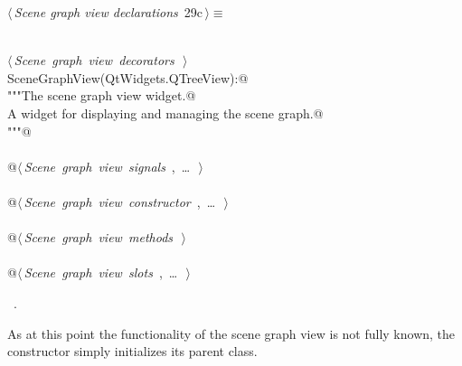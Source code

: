 \documentclass[
    a4paper,      %
    10pt,         %
    openright,    %
    notitlepage,  %
    parskip=half, %
]{scrreprt}       %
\theoremstyle{definition}                    %
\begin{document}
\begin{flushleft} \small
\begin{minipage}{\linewidth}\label{scrap31}\raggedright\small
{} $\langle\,${\itshape Scene graph view declarations}\nobreak\ {\footnotesize {29c}}$\,\rangle\equiv$
\vspace{-1exm}
\begin{list}{}{} \item
\mbox{}\lstinline@@\\
\mbox{}\lstinline@@\hbox{$\langle\,${\itshape Scene graph view decorators}\nobreak\ {\footnotesize {}}$\,\rangle$}\lstinline@@\\
\mbox{}\lstinline@class SceneGraphView(QtWidgets.QTreeView):@\\
\mbox{}\lstinline@    """The scene graph view widget.@\\
\mbox{}\lstinline@    A widget for displaying and managing the scene graph.@\\
\mbox{}\lstinline@    """@\\
\mbox{}\lstinline@@\\
\mbox{}\lstinline@    @\hbox{$\langle\,${\itshape Scene graph view signals}\nobreak\ {\footnotesize {}, \ldots\ }$\,\rangle$}\lstinline@@\\
\mbox{}\lstinline@@\\
\mbox{}\lstinline@    @\hbox{$\langle\,${\itshape Scene graph view constructor}\nobreak\ {\footnotesize {}, \ldots\ }$\,\rangle$}\lstinline@@\\
\mbox{}\lstinline@@\\
\mbox{}\lstinline@    @\hbox{$\langle\,${\itshape Scene graph view methods}\nobreak\ {\footnotesize {}}$\,\rangle$}\lstinline@@\\
\mbox{}\lstinline@@\\
\mbox{}\lstinline@    @\hbox{$\langle\,${\itshape Scene graph view slots}\nobreak\ {\footnotesize {}, \ldots\ }$\,\rangle$}\lstinline@@\\
\mbox{}\lstinline@@{\NWsep}
\end{list}
\vspace{-1.5ex}
\footnotesize
\begin{list}{}{\setlength{\itemsep}{-\parsep}\setlength{\itemindent}{-\leftmargin}}
\item \NWtxtMacroRefIn\ .

\item{}
\end{list}
\end{minipage}\vspace{4ex}
\end{flushleft}
As at this point the functionality of the scene graph view is not fully
known, the constructor simply initializes its parent class.
\end{document}
